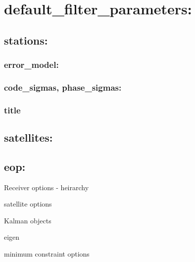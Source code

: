 \section{default\_filter\_parameters:}

\subsection{stations:}

\subsubsection{error\_model:}

\subsubsection{code\_sigmas, phase\_sigmas:}

\subsubsection{title}

\subsection{satellites:}

\subsection{eop:}




Receiver options - heirarchy


satellite options


Kalman objects

eigen

minimum constraint options


